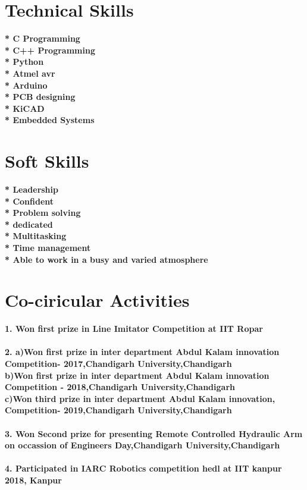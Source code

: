 \documentclass[11pt]{article}
\begin{document}
\section{Technical Skills}
\textbf{* C Programming}\\
\textbf{* C++ Programming}\\
\textbf{* Python}\\
\textbf{* Atmel avr}\\
\textbf{* Arduino}\\
\textbf{* PCB designing}\\
\textbf{* KiCAD}\\
\textbf{* Embedded Systems}\\

\section{Soft Skills}
\textbf{* Leadership}\\
\textbf{* Confident}\\
\textbf{* Problem solving}\\
\textbf{* dedicated}\\
\textbf{* Multitasking}\\
\textbf{* Time management}\\
\textbf{* Able to work in a busy and varied atmosphere }\\

\section{Co-ciricular Activities}
\textbf{1. Won first prize in Line Imitator Competition at IIT Ropar}\\\\
\textbf{2. a)Won first prize in inter department Abdul Kalam innovation Competition- 2017,Chandigarh University,Chandigarh }\\
\textbf{ b)Won first prize in inter department Abdul Kalam innovation Competition - 2018,Chandigarh University,Chandigarh }\\
\textbf{ c)Won third prize in inter department Abdul Kalam innovation, Competition- 2019,Chandigarh University,Chandigarh }\\\\
\textbf{3. Won Second prize for presenting Remote Controlled Hydraulic Arm on occassion of Engineers Day,Chandigarh University,Chandigarh }\\\\
\textbf{4. Participated in IARC Robotics competition hedl at IIT kanpur 2018, Kanpur} \\\\
\end{document}
